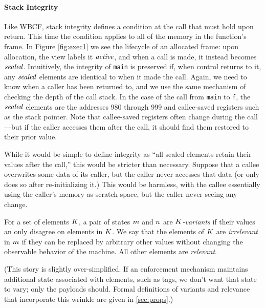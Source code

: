 \documentclass[10pt,conference]{ieeetran}%
\theoremstyle{definition}
\begin{document}

\paragraph*{Stack Integrity}

Like WBCF, stack integrity defines a condition at the call that must hold upon
return. This time the condition applies to all of the memory in the function's
frame. In Figure \ref{fig:exec1} we see the lifecycle of an allocated frame:
upon allocation, the view labels it \(\mathit{active}\), and when a call is made, it instead
becomes \(\mathit{sealed}\). Intuitively, the integrity of {\tt main}
is preserved if, when control returns to it, any \(\mathit{sealed}\) elements
are identical to when it made the call.
%
Again, we need to know when a caller has been returned to,
and we use the same mechanism of checking the depth of the call stack.
%
In the case of the call from {\tt main} to {\tt f}, the \(\mathit{sealed}\) elements are the
addresses 980 through 999 and callee-saved registers such as
the stack pointer. Note that callee-saved registers often change
during the call---but if the caller accesses them after the call, it should find them
restored to their prior value.

While it would be simple to define integrity as ``all sealed elements retain their
values after the call,'' this would be stricter than necessary. Suppose that
a callee overwrites some data of its caller, but the caller never accesses that data
(or only does so after re-initializing it.) This would be harmless, with the callee
essentially using the caller's memory as scratch space, but the caller never seeing any change.

For a set of elements \(K\),
a pair of states \(m\) and \(n\) are {\em \(K\)-variants} if
their values an only disagree on elements in \(K\).
We say that the elements of \(K\) are \emph{irrelevant}
in \(m\) if they can be replaced by arbitrary other values without changing the
observable behavior of the machine. All other elements are \emph{relevant}.

(This story is slightly over-simplified. If an enforcement mechanism maintains
additional state associated with elements, such as tags, we don't want that
state to vary; only the payloads should. Formal definitions of variants and
relevance that incorporate this wrinkle are given in \cref{sec:props}.)
\end{document}
